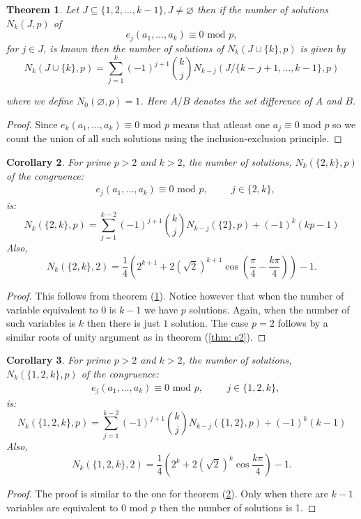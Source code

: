 \documentclass[12pt]{article}
\newtheorem{thm}{Theorem}[subsection]%
\newtheorem{cor}[thm]{Corollary}%
\begin{document}
\begin{thm}\label{thm: including k}
Let $J\subseteq \{1,2,\dots, k-1\}, J\neq \varnothing$ then if the number of solutions $N_k(J,p)$ of \[
e_j(a_1,\dots, a_k)\equiv 0\text{ mod }p,
\]
for $j\in J$, is known then the number of solutions of $N_k(J\cup\{k\},p)$ is given by
\begin{equation}\label{eqn: recurrence add k}
N_k(J\cup \{k\}, p)=\sum_{j=1}^k(-1)^{j+1}\binom{k}{j}N_{k-j}(J/\{k-j+1,\dots, k-1\},p)    
\end{equation}

where we define $N_0(\varnothing,p)=1$. Here $A/B$ denotes the set difference of $A$ and $B$.

\end{thm}
\begin{proof}
    Since $e_k(a_1,\dots,a_k)\equiv 0\text{ mod }p$ means that atleast one $a_j\equiv 0\text{ mod }p$ so we count the union of all such solutions using the inclusion-exclusion principle. 
\end{proof}
\begin{cor}\label{thm: e2, ek}
    For prime $p>2$ and $k>2$, the number of solutions, $N_k(\{2,k\},p)$ of the congruence:
    \begin{align*}
        &e_j(a_1,\dots, a_k)\equiv 0\text{ mod }p, \hspace{1cm}j\in \{2,k\},
    \end{align*} is:
    \[
    N_k(\{2,k\},p)=\sum_{j=1}^{k-2}(-1)^{j+1}\binom{k}{j}N_{k-j}(\{2\},p)+(-1)^{k}(kp-1)
    \]
    Also,\[
    N_k(\{2,k\},2)=\frac{1}{4}\left(2^{k+1}+2(\sqrt{2})^{k+1}\cos\left(\frac{\pi}{4}-\frac{k\pi}{4}\right)\right)-1.
    \]
\end{cor}
\begin{proof}
    This follows from theorem (\ref{thm: including k}).
    Notice however that when the number of variable equivalent to $0$ is $k-1$ we have $p$ solutions. Again, when the number of such variables is $k$ then there is just $1$ solution.
    The case $p=2$ follows by a similar roots of unity argument as in theorem (\ref{thm: e2}).
\end{proof}
\begin{cor}
    For prime $p>2$ and $k>2$, the number of solutions, $N_k(\{1,2,k\},p)$ of the congruence:
    \begin{align*}
        &e_j(a_1,\dots, a_k)\equiv 0\text{ mod }p, \hspace{1cm}j\in \{1,2,k\},
    \end{align*} is:
    \[
    N_k(\{1,2,k\},p)=\sum_{j=1}^{k-2}(-1)^{j+1}\binom{k}{j}N_{k-j}(\{1,2\},p)+(-1)^k(k-1)
    \]
    Also,\[
    N_k(\{1,2,k\},2)=\frac{1}{4}\left(2^k+2(\sqrt{2})^k\cos\frac{k\pi}{4}\right)-1.
    \]
\end{cor}
\begin{proof}
    The proof is similar to the one for theorem (\ref{thm: e2, ek}). Only when there are $k-1$ variables are equivalent to $0 \text{ mod }p$ then the number of solutions is 1.
\end{proof}
\end{document}
